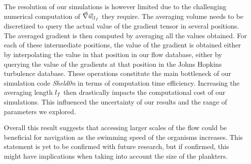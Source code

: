 
The resolution of our simulations is however limited due to the challenging numerical computation of $\vec{\nabla} \vec{u} |_{l_{f}}$ they require.
The averaging volume needs to be discretized to query the actual value of the gradient tensor in several positions.
The averaged gradient is then computed by averaging all the values obtained.
For each of these intermediate positions, the value of the gradient is obtained either by interpolating the value in that position in our flow database, either by querying the value of the gradients at that position in the Johns Hopkins turbulence database.
These operations constitute the main bottleneck of our simulation code \textit{Sheld0n} in terms of computation time efficiency.
Increasing the averaging length $l_{f}$ then drastically impacts the computational cost of our simulations.
This influenced the uncertainty of our results and the range of parameters we explored.

Overall this result suggests that accessing larger scales of the flow could be beneficial for navigation as the swimming speed of the organisms increases.
This statement is yet to be confirmed with future research, but if confirmed, this might have implications when taking into account the size of the plankters.


